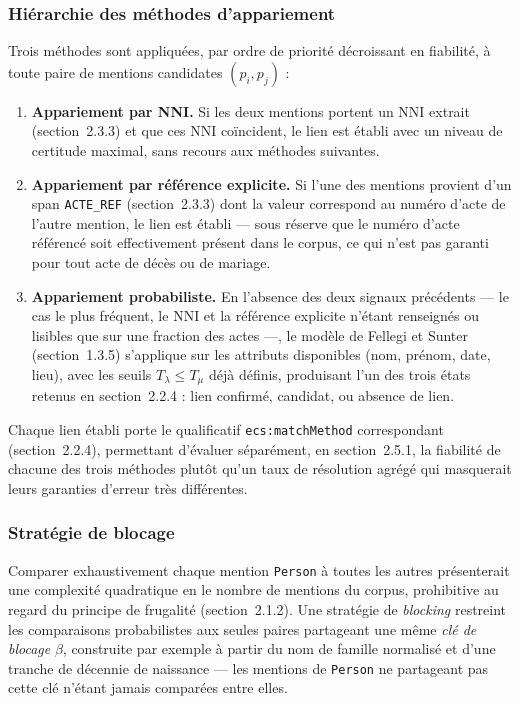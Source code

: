 \subsubsection*{Hiérarchie des méthodes d'appariement}

Trois méthodes sont appliquées, par ordre de priorité décroissant en fiabilité, à toute paire de mentions candidates $(p_i, p_j)$ :

\begin{enumerate}
    \item \textbf{Appariement par NNI.} Si les deux mentions portent un NNI extrait (section~2.3.3) et que ces NNI coïncident, le lien est établi avec un niveau de certitude maximal, sans recours aux méthodes suivantes.
    \item \textbf{Appariement par référence explicite.} Si l'une des mentions provient d'un span \texttt{ACTE\_REF} (section~2.3.3) dont la valeur correspond au numéro d'acte de l'autre mention, le lien est établi --- sous réserve que le numéro d'acte référencé soit effectivement présent dans le corpus, ce qui n'est pas garanti pour tout acte de décès ou de mariage.
    \item \textbf{Appariement probabiliste.} En l'absence des deux signaux précédents --- le cas le plus fréquent, le NNI et la référence explicite n'étant renseignés ou lisibles que sur une fraction des actes ---, le modèle de Fellegi et Sunter (section~1.3.5) s'applique sur les attributs disponibles (nom, prénom, date, lieu), avec les seuils $T_\lambda \leq T_\mu$ déjà définis, produisant l'un des trois états retenus en section~2.2.4 : lien confirmé, candidat, ou absence de lien.
\end{enumerate}

Chaque lien établi porte le qualificatif \texttt{ecs:matchMethod} correspondant (section~2.2.4), permettant d'évaluer séparément, en section~2.5.1, la fiabilité de chacune des trois méthodes plutôt qu'un taux de résolution agrégé qui masquerait leurs garanties d'erreur très différentes.

\subsubsection*{Stratégie de blocage}

Comparer exhaustivement chaque mention \texttt{Person} à toutes les autres présenterait une complexité quadratique en le nombre de mentions du corpus, prohibitive au regard du principe de frugalité (section~2.1.2).
Une stratégie de \textit{blocking} restreint les comparaisons probabilistes aux seules paires partageant une même \emph{clé de blocage} $\beta$, construite par exemple à partir du nom de famille normalisé et d'une tranche de décennie de naissance --- les mentions de \texttt{Person} ne partageant pas cette clé n'étant jamais comparées entre elles.

